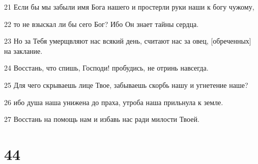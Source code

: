 \par 21 Если бы мы забыли имя Бога нашего и простерли руки наши к богу чужому,
\par 22 то не взыскал ли бы сего Бог? Ибо Он знает тайны сердца.
\par 23 Но за Тебя умерщвляют нас всякий день, считают нас за овец, [обреченных] на заклание.
\par 24 Восстань, что спишь, Господи! пробудись, не отринь навсегда.
\par 25 Для чего скрываешь лице Твое, забываешь скорбь нашу и угнетение наше?
\par 26 ибо душа наша унижена до праха, утроба наша прильнула к земле.
\par 27 Восстань на помощь нам и избавь нас ради милости Твоей.

\chapter{44}

